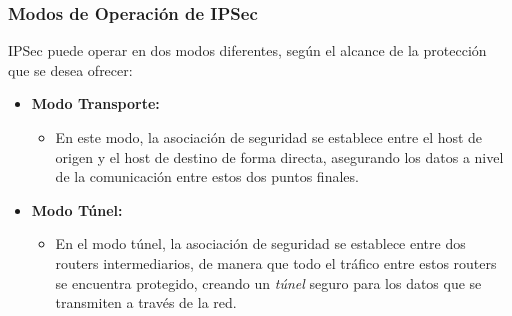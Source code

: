 \documentclass[a4paper,12pt]{article}
\begin{document}
\subsubsection{Modos de Operación de IPSec}

IPSec puede operar en dos modos diferentes, según el alcance de la protección que se desea ofrecer:

\begin{itemize}
    \item \textbf{Modo Transporte:} 
    \begin{itemize}
        \item En este modo, la asociación de seguridad se establece entre el host de origen y el host de destino de forma directa, asegurando los datos a nivel de la comunicación entre estos dos puntos finales.
    \end{itemize}
    \item \textbf{Modo Túnel:} 
    \begin{itemize}
        \item En el modo túnel, la asociación de seguridad se establece entre dos routers intermediarios, de manera que todo el tráfico entre estos routers se encuentra protegido, creando un \textit{túnel} seguro para los datos que se transmiten a través de la red.
    \end{itemize}
\end{itemize}
\end{document}
